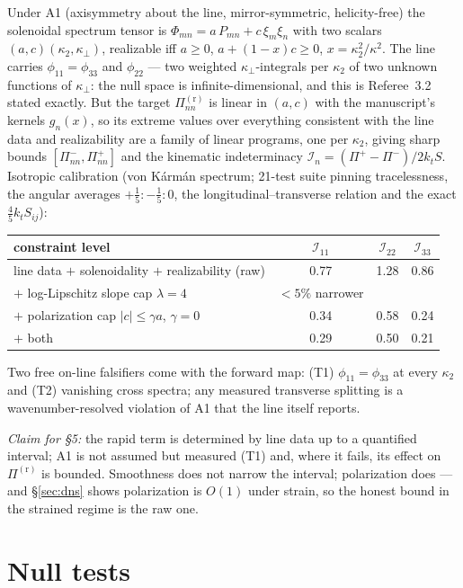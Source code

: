 \documentclass[11pt,a4paper]{article}
\newcommand{\Pir}[1]{\Pi^{(\mathrm r)}_{#1}}
\newcommand{\kt}{k_t}
\newcommand{\kperp}{\kappa_\perp}
\begin{document}
Under A1 (axisymmetry about the line, mirror-symmetric, helicity-free) the
solenoidal spectrum tensor is $\Phi_{mn}=a\,P_{mn}+c\,\xi_m\xi_n$ with two
scalars $(a,c)(\kappa_2,\kperp)$, realizable iff $a\ge0$, $a+(1-x)c\ge0$,
$x=\kappa_2^2/\kappa^2$. The line carries $\phi_{11}=\phi_{33}$ and
$\phi_{22}$ --- two weighted $\kperp$-integrals per $\kappa_2$ of two
unknown functions of $\kperp$: the null space is infinite-dimensional, and
this is Referee~3.2 stated exactly. But the target $\Pir{nn}$ is linear in
$(a,c)$ with the manuscript's kernels $g_n(x)$, so its extreme values over
everything consistent with the line data and realizability are a family of
linear programs, one per $\kappa_2$, giving sharp bounds
$[\Pi^-_{nn},\Pi^+_{nn}]$ and the kinematic indeterminacy
$\mathcal I_n=(\Pi^+-\Pi^-)/2\kt S$. Isotropic calibration (von K\'arm\'an
spectrum; 21-test suite pinning tracelessness, the angular averages
$+\tfrac15:-\tfrac15:0$, the longitudinal--transverse relation and the
exact $\tfrac45\kt S_{ij}$):
\begin{center}\small
\begin{tabular}{lccc}
\toprule
constraint level & $\mathcal I_{11}$ & $\mathcal I_{22}$ & $\mathcal I_{33}$\\
\midrule
line data $+$ solenoidality $+$ realizability (raw) & 0.77 & 1.28 & 0.86\\
$+$ log-Lipschitz slope cap $\lambda=4$ & $<5\%$ narrower & & \\
$+$ polarization cap $|c|\le\gamma a$, $\gamma=0$ & 0.34 & 0.58 & 0.24\\
$+$ both & 0.29 & 0.50 & 0.21\\
\bottomrule
\end{tabular}
\end{center}
Two free on-line falsifiers come with the forward map: (T1)
$\phi_{11}=\phi_{33}$ at every $\kappa_2$ and (T2) vanishing cross
spectra; any measured transverse splitting is a wavenumber-resolved
violation of A1 that the line itself reports.

\emph{Claim for \S5:} the rapid term is determined by line data up to a
quantified interval; A1 is not assumed but measured (T1) and, where it
fails, its effect on $\Pir{}$ is bounded. Smoothness does not narrow the
interval; polarization does --- and \S\ref{sec:dns} shows polarization is
$O(1)$ under strain, so the honest bound in the strained regime is the raw
one.

\section{Null tests}\label{sec:null}
\end{document}

